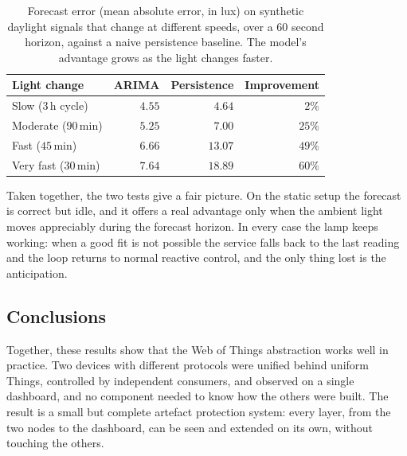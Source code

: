 \documentclass[conference]{IEEEtran}
\begin{document}
\begin{table}[htbp]
\caption{Forecast error (mean absolute error, in lux) on synthetic daylight signals that change at different speeds, over a $60$ second horizon, against a naive persistence baseline. The model's advantage grows as the light changes faster.}
\label{tab:forecast-eval}
\centering
\footnotesize
\begin{tabular}{@{}lrrr@{}}
\toprule
\textbf{Light change} & \textbf{ARIMA} & \textbf{Persistence} & \textbf{Improvement} \\
\midrule
Slow ($3$\,h cycle)   & $4.55$ & $4.64$  & $2\%$  \\
Moderate ($90$\,min)  & $5.25$ & $7.00$  & $25\%$ \\
Fast ($45$\,min)      & $6.66$ & $13.07$ & $49\%$ \\
Very fast ($30$\,min) & $7.64$ & $18.89$ & $60\%$ \\
\bottomrule
\end{tabular}
\end{table}

Taken together, the two tests give a fair picture. On the static setup the forecast is correct but idle, and it offers a real advantage only when the ambient light moves appreciably during the forecast horizon. In every case the lamp keeps working: when a good fit is not possible the service falls back to the last reading and the loop returns to normal reactive control, and the only thing lost is the anticipation.

\subsection{Conclusions}
Together, these results show that the Web of Things abstraction works well in practice. Two devices with different protocols were unified behind uniform Things, controlled by independent consumers, and observed on a single dashboard, and no component needed to know how the others were built. The result is a small but complete artefact protection system: every layer, from the two nodes to the dashboard, can be seen and extended on its own, without touching the others.
\end{document}
